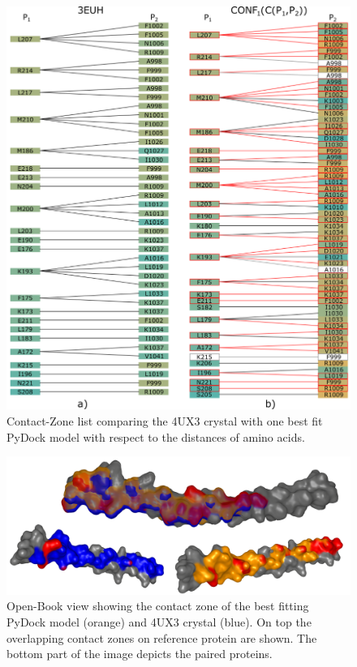 \documentclass{bmcart}
\def\OpBook {Open-Book view\xspace}
\def\CoZoList{Contact-Zone list\xspace}
\begin{document}
\begin{backmatter}
\begin{figure}[h!]
    \centering
  \includegraphics[width=\columnwidth]{images/figure13.pdf}
    \caption{ \CoZoList comparing the 4UX3 crystal with one best fit PyDock model with respect to the distances of amino acids.}
  \label{fig:coiled2}
\end{figure}

\begin{figure}[!h]
  \centering
  \includegraphics[width=\columnwidth]{images/figure14.png}
  \caption{ \OpBook showing the contact zone of the best fitting PyDock model (orange) and 4UX3 crystal (blue). On top the overlapping contact zones on reference protein are shown. The bottom part of the image depicts the paired proteins.}
  \label{fig:selection_4_final_SMC3_PyDock}
\end{figure}


\end{backmatter}
\end{document}
